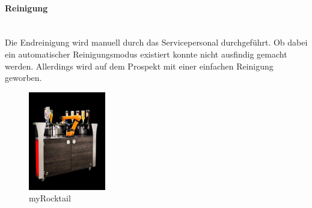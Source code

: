 \paragraph{Reinigung}\label{subsubsec:Reinigung_myRocktail}\mbox{}\\

Die Endreinigung wird manuell durch das Servicepersonal durchgeführt. Ob dabei ein automatischer Reinigungsmodus existiert konnte nicht ausfindig gemacht werden. Allerdings wird auf dem Prospekt mit einer einfachen Reinigung geworben. \cite{myrocktail.de_home_nodate}

\begin{figure}[h!]
	\centering
	\includegraphics[width=0.3\textwidth]{graphics/myRocktail.jpg}
	\caption{myRocktail \cite{myrocktail.de_home_nodate}}
	\label{fig:myRocktail_Cocktailmaschine }
\end{figure}